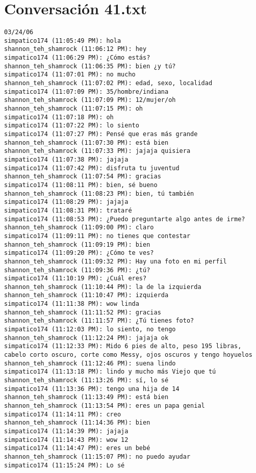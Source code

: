 \section{Conversaci\'on 41.txt}

\begin{verbatim}
03/24/06
simpatico174 (11:05:49 PM): hola
shannon_teh_shamrock (11:06:12 PM): hey
simpatico174 (11:06:29 PM): ¿Cómo estás?
shannon_teh_shamrock (11:06:35 PM): bien ¿y tú?
simpatico174 (11:07:01 PM): no mucho
shannon_teh_shamrock (11:07:02 PM): edad, sexo, localidad
simpatico174 (11:07:09 PM): 35/hombre/indiana
shannon_teh_shamrock (11:07:09 PM): 12/mujer/oh
shannon_teh_shamrock (11:07:15 PM): oh
simpatico174 (11:07:18 PM): oh
simpatico174 (11:07:22 PM): lo siento
simpatico174 (11:07:27 PM): Pensé que eras más grande
shannon_teh_shamrock (11:07:30 PM): está bien
shannon_teh_shamrock (11:07:33 PM): jajaja quisiera
simpatico174 (11:07:38 PM): jajaja
simpatico174 (11:07:42 PM): disfruta tu juventud
shannon_teh_shamrock (11:07:54 PM): gracias
simpatico174 (11:08:11 PM): bien, sé bueno
shannon_teh_shamrock (11:08:23 PM): bien, tú también
simpatico174 (11:08:29 PM): jajaja
simpatico174 (11:08:31 PM): trataré
simpatico174 (11:08:53 PM): ¿Puedo preguntarte algo antes de irme?
shannon_teh_shamrock (11:09:00 PM): claro
simpatico174 (11:09:11 PM): no tienes que contestar
shannon_teh_shamrock (11:09:19 PM): bien
simpatico174 (11:09:20 PM): ¿Cómo te ves?
shannon_teh_shamrock (11:09:32 PM): Hay una foto en mi perfil
shannon_teh_shamrock (11:09:36 PM): ¿tú?
simpatico174 (11:10:19 PM): ¿Cuál eres?
shannon_teh_shamrock (11:10:44 PM): la de la izquierda
shannon_teh_shamrock (11:10:47 PM): izquierda
simpatico174 (11:11:38 PM): wow linda
shannon_teh_shamrock (11:11:52 PM): gracias
shannon_teh_shamrock (11:11:57 PM): ¿Tú tienes foto?
simpatico174 (11:12:03 PM): lo siento, no tengo
shannon_teh_shamrock (11:12:24 PM): jajaja ok
simpatico174 (11:12:33 PM): Mido 6 pies de alto, peso 195 libras, cabelo corto oscuro, corte como Messy, ojos oscuros y tengo hoyuelos 
shannon_teh_shamrock (11:12:46 PM): suena lindo
simpatico174 (11:13:18 PM): lindo y mucho más Viejo que tú
shannon_teh_shamrock (11:13:26 PM): sí, lo sé
simpatico174 (11:13:36 PM): tengo una hija de 14
shannon_teh_shamrock (11:13:49 PM): está bien
shannon_teh_shamrock (11:13:54 PM): eres un papa genial
simpatico174 (11:14:11 PM): creo
shannon_teh_shamrock (11:14:36 PM): bien
simpatico174 (11:14:39 PM): jajaja
simpatico174 (11:14:43 PM): wow 12
simpatico174 (11:14:47 PM): eres un bebé
shannon_teh_shamrock (11:15:07 PM): no puedo ayudar
simpatico174 (11:15:24 PM): Lo sé

\end{verbatim}
